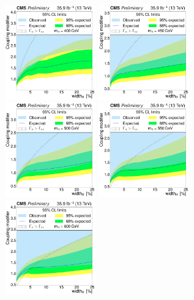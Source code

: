\begin{figure}[!Hhtb]
\centering
\includegraphics[width=0.35\textwidth,keepaspectratio=true]{fig/chapt8/limits/limit_H_M400.pdf}
\includegraphics[width=0.35\textwidth,keepaspectratio=true]{fig/chapt8/limits/limit_H_M450.pdf}
\includegraphics[width=0.35\textwidth,keepaspectratio=true]{fig/chapt8/limits/limit_H_M500.pdf}
\includegraphics[width=0.35\textwidth,keepaspectratio=true]{fig/chapt8/limits/limit_H_M550.pdf}
\includegraphics[width=0.35\textwidth,keepaspectratio=true]{fig/chapt8/limits/limit_H_M600.pdf}

\end{figure}
